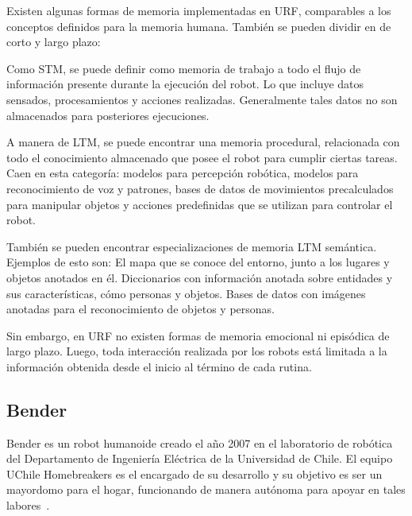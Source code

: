 Existen algunas formas de memoria implementadas en URF, comparables a los conceptos definidos para la memoria humana. También se pueden dividir en de corto y largo plazo:

Como STM, se puede definir como memoria de trabajo a todo el flujo de información presente durante la ejecución del robot. Lo que incluye datos sensados, procesamientos y acciones realizadas. Generalmente tales datos no son almacenados para posteriores ejecuciones.

A manera de LTM, se puede encontrar una memoria procedural, relacionada con todo el conocimiento almacenado que posee el robot para cumplir ciertas tareas. Caen en esta categoría: modelos para percepción robótica, modelos para reconocimiento de voz y patrones, bases de datos de movimientos precalculados para manipular objetos y acciones predefinidas que se utilizan para controlar el robot.

También se pueden encontrar especializaciones de memoria LTM semántica. Ejemplos de esto son: El mapa que se conoce del entorno, junto a los lugares y objetos anotados en él. Diccionarios con información anotada sobre entidades y sus características, cómo personas y objetos. Bases de datos con imágenes anotadas para el reconocimiento de objetos y personas. 

Sin embargo, en URF no existen formas de memoria emocional ni episódica de largo plazo. Luego, toda interacción realizada por los robots está limitada a la información obtenida desde el inicio al término de cada rutina.


\subsection{Bender}

Bender es un robot humanoide creado el año 2007 en el laboratorio de robótica del Departamento de Ingeniería Eléctrica de la Universidad de Chile. El equipo UChile Homebreakers es el encargado de su desarrollo y  su objetivo es ser un mayordomo para el hogar, funcionando de manera autónoma para apoyar en tales labores~\cite{uchile-robotics}.

